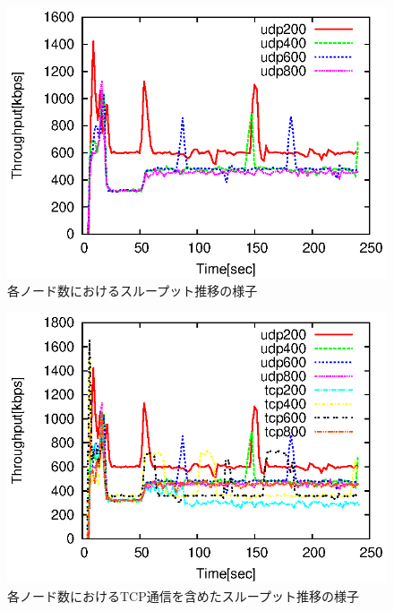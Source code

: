 \documentclass[letter]{ieicej}
\begin{document}
\begin{figure}[h]
  \begin{center}
    \includegraphics{fig8.eps}
  \end{center}
  \caption{各ノード数におけるスループット推移の様子}
  \label{fig:fig08}
\end{figure}

\begin{figure}[h]
  \begin{center}
    \includegraphics{fig9.eps}
  \end{center}
  \caption{各ノード数におけるTCP通信を含めたスループット推移の様子}
  \label{fig:fig09}
\end{figure}
\end{document}
